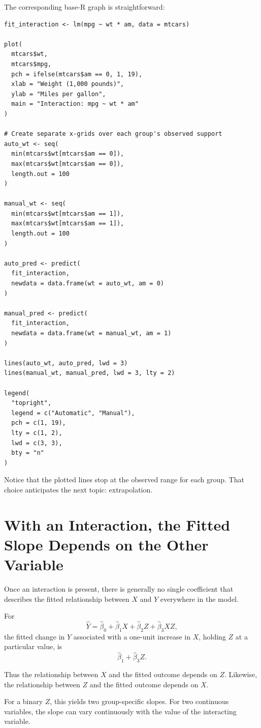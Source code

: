 \documentclass[11pt]{report}
\begin{document}
The corresponding base-R graph is straightforward:

\begin{lstlisting}
fit_interaction <- lm(mpg ~ wt * am, data = mtcars)

plot(
  mtcars$wt,
  mtcars$mpg,
  pch = ifelse(mtcars$am == 0, 1, 19),
  xlab = "Weight (1,000 pounds)",
  ylab = "Miles per gallon",
  main = "Interaction: mpg ~ wt * am"
)

# Create separate x-grids over each group's observed support
auto_wt <- seq(
  min(mtcars$wt[mtcars$am == 0]),
  max(mtcars$wt[mtcars$am == 0]),
  length.out = 100
)

manual_wt <- seq(
  min(mtcars$wt[mtcars$am == 1]),
  max(mtcars$wt[mtcars$am == 1]),
  length.out = 100
)

auto_pred <- predict(
  fit_interaction,
  newdata = data.frame(wt = auto_wt, am = 0)
)

manual_pred <- predict(
  fit_interaction,
  newdata = data.frame(wt = manual_wt, am = 1)
)

lines(auto_wt, auto_pred, lwd = 3)
lines(manual_wt, manual_pred, lwd = 3, lty = 2)

legend(
  "topright",
  legend = c("Automatic", "Manual"),
  pch = c(1, 19),
  lty = c(1, 2),
  lwd = c(3, 3),
  bty = "n"
)
\end{lstlisting}

Notice that the plotted lines stop at the observed range for each group. That choice anticipates the next topic: extrapolation.

\section{With an Interaction, the Fitted Slope Depends on the Other Variable}

Once an interaction is present, there is generally no single coefficient that describes the fitted relationship between \(X\) and \(Y\) everywhere in the model.

For
\[
\widehat{Y}
=
\widehat{\beta}_0+
\widehat{\beta}_1X+
\widehat{\beta}_2Z+
\widehat{\beta}_3XZ,
\]
the fitted change in \(Y\) associated with a one-unit increase in \(X\), holding \(Z\) at a particular value, is
\[
\widehat{\beta}_1+
\widehat{\beta}_3Z.
\]

Thus the relationship between \(X\) and the fitted outcome depends on \(Z\). Likewise, the relationship between \(Z\) and the fitted outcome depends on \(X\).

For a binary \(Z\), this yields two group-specific slopes. For two continuous variables, the slope can vary continuously with the value of the interacting variable.
\end{document}
